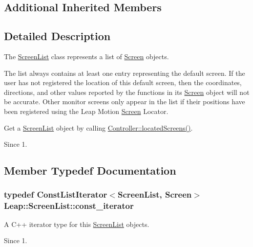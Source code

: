 \subsection*{Additional Inherited Members}


\subsection{Detailed Description}
The \hyperlink{class_leap_1_1_screen_list}{Screen\+List} class represents a list of \hyperlink{class_leap_1_1_screen}{Screen} objects.

The list always contains at least one entry representing the default screen. If the user has not registered the location of this default screen, then the coordinates, directions, and other values reported by the functions in its \hyperlink{class_leap_1_1_screen}{Screen} object will not be accurate. Other monitor screens only appear in the list if their positions have been registered using the Leap Motion \hyperlink{class_leap_1_1_screen}{Screen} Locator.

Get a \hyperlink{class_leap_1_1_screen_list}{Screen\+List} object by calling \hyperlink{class_leap_1_1_controller_ab6cf5b48ef434b3d58cf8962451f4df3}{Controller\+::located\+Screens()}.


\begin{DoxyCodeInclude}
\end{DoxyCodeInclude}
 \begin{DoxySince}{Since}
1. 
\end{DoxySince}


\subsection{Member Typedef Documentation}
\hypertarget{class_leap_1_1_screen_list_aa5375d780cb454e661f94096dcefd431}{
\subsubsection[{const\+\_\+iterator}]{\setlength{\rightskip}{0pt plus 5cm}typedef {\bf Const\+List\+Iterator}$<${\bf Screen\+List}, {\bf Screen}$>$ {\bf Leap\+::\+Screen\+List\+::const\+\_\+iterator}}}\label{class_leap_1_1_screen_list_aa5375d780cb454e661f94096dcefd431}
A C++ iterator type for this \hyperlink{class_leap_1_1_screen_list}{Screen\+List} objects. \begin{DoxySince}{Since}
1. 
\end{DoxySince}


